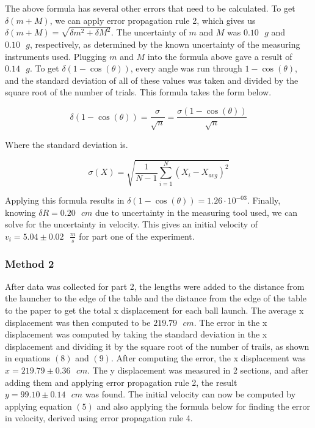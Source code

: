 \documentclass[11pt]{article}
\begin{document}
The above formula has several other errors that need to be calculated.
To get \(\delta(m + M)\), we can apply error propagation rule 2, which
gives us \(\delta(m + M) = \sqrt{\delta m^2 + \delta M^2}\). The
uncertainty of \(m\) and \(M\) was \(0.10 \text{ }g\) and
\(0.10 \text{ }g\), respectively, as determined by the known uncertainty
of the measuring instruments used. Plugging \(m\) and \(M\) into the
formula above gave a result of \(0.14 \text{ }g\). To get
\(\delta(1 - \cos(\theta))\), every angle was run through
\(1 - \cos(\theta)\), and the standard deviation of all of these values
was taken and divided by the square root of the number of trials. This formula takes the
form below.

\begin{equation}
\delta(1 - \cos(\theta)) = \frac {\sigma}{\sqrt{n}} = \frac {\sigma(1 - \cos(\theta))}{\sqrt{n}}
\end{equation}

 Where the standard deviation is.
 
 \begin{equation}
\sigma(X)=\sqrt{\frac{1}{N-1}\sum_{i=1}^N(X_i - X_{avg})^2}
\end{equation}

Applying this formula results in
\(\delta(1 - \cos(\theta)) = 1.26 \cdot 10^{-03}\). Finally, knowing
\(\delta R = 0.20 \text{ }cm\) due to uncertainty in the measuring tool
used, we can solve for the uncertainty in velocity. This gives an
initial velocity of \(v_i = 5.04 \pm 0.02\text{ }\frac {m}{s}\) for part
one of the experiment.

\hypertarget{method-2-2}{%
\subsubsection*{\centering Method 2}\label{method-2-2}}

After data was collected for part 2, the lengths were added to the
distance from the launcher to the edge of the table and the distance
from the edge of the table to the paper to get the total x displacement
for each ball launch. The average x displacement was then computed to be
\(219.79 \text{ }cm\). The error in the x displacement was computed by
taking the standard deviation in the x displacement and dividing it by
the square root of the number of trails, as shown in equations \((8)\)
and \((9)\). After computing the error, the x displacement was
\(x = 219.79 \pm 0.36\text{ }cm\). The y displacement was measured in 2
sections, and after adding them and applying error propagation rule 2,
the result \(y = 99.10 \pm 0.14\text{ }cm\) was found. The initial
velocity can now be computed by applying equation \((5)\) and also
applying the formula below for finding the error in velocity, derived
using error propagation rule 4.
\end{document}
